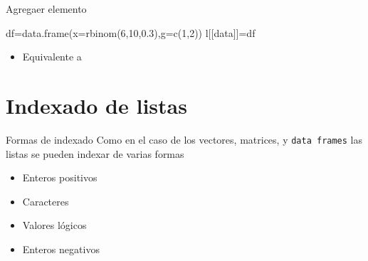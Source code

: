 \documentclass[
  ignorenonframetext,
  aspectratio=169,
  spanish,
]{beamer}
\newenvironment{Shaded}{\begin{snugshade}}{\end{snugshade}}
\newcommand{\AttributeTok}[1]{\textcolor[rgb]{0.40,0.45,0.13}{#1}}
\newcommand{\DecValTok}[1]{\textcolor[rgb]{0.68,0.00,0.00}{#1}}
\newcommand{\FloatTok}[1]{\textcolor[rgb]{0.68,0.00,0.00}{#1}}
\newcommand{\FunctionTok}[1]{\textcolor[rgb]{0.28,0.35,0.67}{#1}}
\newcommand{\NormalTok}[1]{\textcolor[rgb]{0.00,0.23,0.31}{#1}}
\newcommand{\OtherTok}[1]{\textcolor[rgb]{0.00,0.23,0.31}{#1}}
\newcommand{\SpecialCharTok}[1]{\textcolor[rgb]{0.37,0.37,0.37}{#1}}
\newcommand{\StringTok}[1]{\textcolor[rgb]{0.13,0.47,0.30}{#1}}
\providecommand{\tightlist}{%
  \setlength{\itemsep}{0pt}\setlength{\parskip}{0pt}}
\begin{document}
\begin{frame}[fragile]{Agregaer elemento}
\label{agregaer-elemento}
\begin{Shaded}
\begin{Highlighting}[]
\NormalTok{df}\OtherTok{=}\FunctionTok{data.frame}\NormalTok{(}\AttributeTok{x=}\FunctionTok{rbinom}\NormalTok{(}\DecValTok{6}\NormalTok{,}\DecValTok{10}\NormalTok{,}\FloatTok{0.3}\NormalTok{),}\AttributeTok{g=}\FunctionTok{c}\NormalTok{(}\DecValTok{1}\NormalTok{,}\DecValTok{2}\NormalTok{))}
\NormalTok{l[[}\StringTok{\textquotesingle{}data\textquotesingle{}}\NormalTok{]]}\OtherTok{=}\NormalTok{df}
\end{Highlighting}
\end{Shaded}

\begin{itemize}
\tightlist
\item
  Equivalente a
\end{itemize}

\begin{Shaded}
\end{Shaded}
\end{frame}

\section{Indexado de listas}\label{indexado-de-listas}

\begin{frame}[fragile]{Formas de indexado}
\label{formas-de-indexado}
Como en el caso de los vectores, matrices, y \texttt{data\ frames} las
listas se pueden indexar de varias formas

\begin{itemize}
\tightlist
\item
  Enteros positivos
\item
  Caracteres
\item
  Valores lógicos
\item
  Enteros negativos
\end{itemize}
\end{frame}
\end{document}
